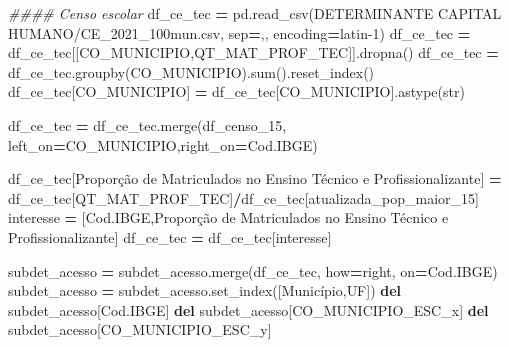 \documentclass[
  12,
  dvipsnames]{article}
\newenvironment{Shaded}{\begin{snugshade}}{\end{snugshade}}
\newcommand{\BuiltInTok}[1]{#1}
\newcommand{\CommentTok}[1]{\textcolor[rgb]{0.56,0.35,0.01}{\textit{#1}}}
\newcommand{\KeywordTok}[1]{\textcolor[rgb]{0.13,0.29,0.53}{\textbf{#1}}}
\newcommand{\NormalTok}[1]{#1}
\newcommand{\OperatorTok}[1]{\textcolor[rgb]{0.81,0.36,0.00}{\textbf{#1}}}
\newcommand{\StringTok}[1]{\textcolor[rgb]{0.31,0.60,0.02}{#1}}
\begin{document}
\begin{Shaded}
\begin{Highlighting}[]
\CommentTok{\#\#\#\# Censo escolar}
\NormalTok{df\_ce\_tec }\OperatorTok{=}\NormalTok{ pd.read\_csv(}\StringTok{\textquotesingle{}DETERMINANTE CAPITAL HUMANO/CE\_2021\_100mun.csv\textquotesingle{}}\NormalTok{,}
\NormalTok{                         sep}\OperatorTok{=}\StringTok{\textquotesingle{},\textquotesingle{}}\NormalTok{, encoding}\OperatorTok{=}\StringTok{\textquotesingle{}latin{-}1\textquotesingle{}}\NormalTok{)}
\NormalTok{df\_ce\_tec }\OperatorTok{=}\NormalTok{ df\_ce\_tec[[}\StringTok{\textquotesingle{}CO\_MUNICIPIO\textquotesingle{}}\NormalTok{,}\StringTok{\textquotesingle{}QT\_MAT\_PROF\_TEC\textquotesingle{}}\NormalTok{]].dropna()}
\NormalTok{df\_ce\_tec }\OperatorTok{=}\NormalTok{ df\_ce\_tec.groupby(}\StringTok{\textquotesingle{}CO\_MUNICIPIO\textquotesingle{}}\NormalTok{).}\BuiltInTok{sum}\NormalTok{().reset\_index()}
\NormalTok{df\_ce\_tec[}\StringTok{\textquotesingle{}CO\_MUNICIPIO\textquotesingle{}}\NormalTok{] }\OperatorTok{=}\NormalTok{ df\_ce\_tec[}\StringTok{\textquotesingle{}CO\_MUNICIPIO\textquotesingle{}}\NormalTok{].astype(}\BuiltInTok{str}\NormalTok{)}

\NormalTok{df\_ce\_tec }\OperatorTok{=}\NormalTok{ df\_ce\_tec.merge(df\_censo\_15, left\_on}\OperatorTok{=}\StringTok{\textquotesingle{}CO\_MUNICIPIO\textquotesingle{}}\NormalTok{,right\_on}\OperatorTok{=}\StringTok{\textquotesingle{}Cod.IBGE\textquotesingle{}}\NormalTok{)}

\NormalTok{df\_ce\_tec[}\StringTok{\textquotesingle{}Proporção de Matriculados no Ensino Técnico e Profissionalizante\textquotesingle{}}\NormalTok{] }\OperatorTok{=}\NormalTok{ df\_ce\_tec[}\StringTok{\textquotesingle{}QT\_MAT\_PROF\_TEC\textquotesingle{}}\NormalTok{]}\OperatorTok{/}\NormalTok{df\_ce\_tec[}\StringTok{\textquotesingle{}atualizada\_pop\_maior\_15\textquotesingle{}}\NormalTok{]}
\NormalTok{interesse }\OperatorTok{=}\NormalTok{ [}\StringTok{\textquotesingle{}Cod.IBGE\textquotesingle{}}\NormalTok{,}\StringTok{\textquotesingle{}Proporção de Matriculados no Ensino Técnico e Profissionalizante\textquotesingle{}}\NormalTok{]}
\NormalTok{df\_ce\_tec }\OperatorTok{=}\NormalTok{ df\_ce\_tec[interesse]}

\NormalTok{subdet\_acesso }\OperatorTok{=}\NormalTok{ subdet\_acesso.merge(df\_ce\_tec, how}\OperatorTok{=}\StringTok{\textquotesingle{}right\textquotesingle{}}\NormalTok{, on}\OperatorTok{=}\StringTok{\textquotesingle{}Cod.IBGE\textquotesingle{}}\NormalTok{)}
\NormalTok{subdet\_acesso }\OperatorTok{=}\NormalTok{ subdet\_acesso.set\_index([}\StringTok{\textquotesingle{}Município\textquotesingle{}}\NormalTok{,}\StringTok{\textquotesingle{}UF\textquotesingle{}}\NormalTok{])}
\KeywordTok{del}\NormalTok{ subdet\_acesso[}\StringTok{\textquotesingle{}Cod.IBGE\textquotesingle{}}\NormalTok{]}
\KeywordTok{del}\NormalTok{ subdet\_acesso[}\StringTok{\textquotesingle{}CO\_MUNICIPIO\_ESC\_x\textquotesingle{}}\NormalTok{]}
\KeywordTok{del}\NormalTok{ subdet\_acesso[}\StringTok{\textquotesingle{}CO\_MUNICIPIO\_ESC\_y\textquotesingle{}}\NormalTok{]}


\end{Highlighting}
\end{Shaded}
\end{document}
